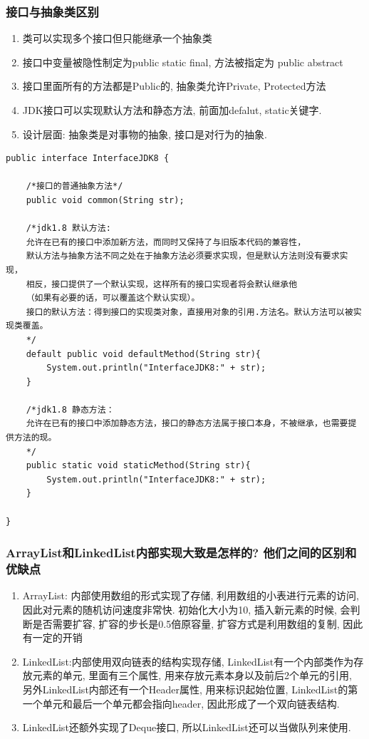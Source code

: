 \subsubsection{接口与抽象类区别}
\begin{enumerate}
	\item 类可以实现多个接口但只能继承一个抽象类
	\item 接口中变量被隐性制定为public static final, 方法被指定为 public abstract
	\item 接口里面所有的方法都是Public的, 抽象类允许Private, Protected方法
	\item JDK接口可以实现默认方法和静态方法, 前面加defalut, static关键字.
	\item 设计层面: 抽象类是对事物的抽象, 接口是对行为的抽象.
\end{enumerate}
\begin{lstlisting}
public interface InterfaceJDK8 {
	
	/*接口的普通抽象方法*/
	public void common(String str);
	
	/*jdk1.8 默认方法:
	允许在已有的接口中添加新方法，而同时又保持了与旧版本代码的兼容性，
	默认方法与抽象方法不同之处在于抽象方法必须要求实现，但是默认方法则没有要求实现，
	相反，接口提供了一个默认实现，这样所有的接口实现者将会默认继承他
	（如果有必要的话，可以覆盖这个默认实现）。
	接口的默认方法：得到接口的实现类对象，直接用对象的引用.方法名。默认方法可以被实现类覆盖。
	*/
	default public void defaultMethod(String str){
		System.out.println("InterfaceJDK8:" + str);
	}
	
	/*jdk1.8 静态方法：
	允许在已有的接口中添加静态方法，接口的静态方法属于接口本身，不被继承，也需要提供方法的现。
	*/
	public static void staticMethod(String str){
		System.out.println("InterfaceJDK8:" + str);
	}
	
}
\end{lstlisting}
\subsubsection{ArrayList和LinkedList内部实现大致是怎样的? 他们之间的区别和优缺点}
\begin{enumerate}
	\item ArrayList: 内部使用数组的形式实现了存储, 利用数组的小表进行元素的访问, 因此对元素的随机访问速度非常快. 初始化大小为10, 插入新元素的时候, 会判断是否需要扩容, 扩容的步长是0.5倍原容量, 扩容方式是利用数组的复制, 因此有一定的开销
	\item LinkedList:内部使用双向链表的结构实现存储, LinkedList有一个内部类作为存放元素的单元, 里面有三个属性, 用来存放元素本身以及前后2个单元的引用, 另外LinkedList内部还有一个Header属性, 用来标识起始位置, LinkedList的第一个单元和最后一个单元都会指向header, 因此形成了一个双向链表结构.
	\item LinkedList还额外实现了Deque接口, 所以LinkedList还可以当做队列来使用. \par
\end{enumerate}

